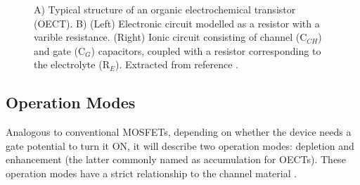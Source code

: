 \begin{figure}[h]
	\centering
	\hspace{2em}
	\caption{A) Typical structure of an organic electrochemical transistor (OECT). B) (Left) Electronic circuit modelled as a resistor with a varible resistance. (Right) Ionic circuit consisting of channel (C$_{CH}$) and gate (C$_{G}$) capacitors, coupled with a resistor corresponding to the electrolyte (R$_{E}$). Extracted from reference \cite{rivnayOrganicElectrochemicalTransistors2018}.}
	\label{fig:bernard}
\end{figure}


\subsection{Operation Modes}

Analogous to conventional MOSFETs, depending on whether the device needs a gate potential to turn it ON, it will describe two operation modes: depletion and enhancement (the latter commonly named as accumulation for OECTs). These operation modes have a strict relationship to the channel material%
.

